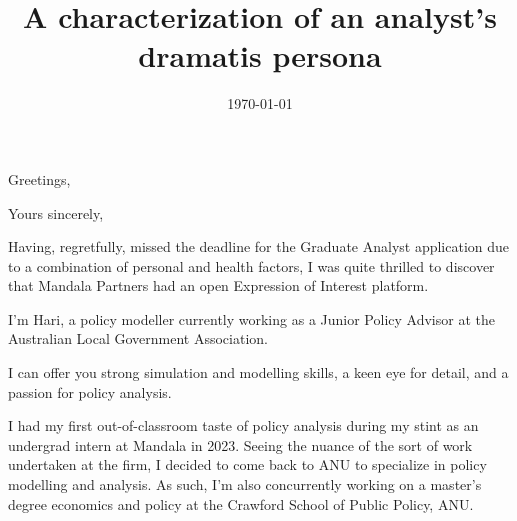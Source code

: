 \documentclass[11pt,a4paper,sans]{moderncv}
\title{A characterization of an analyst's dramatis persona}                               \address{Canberra}{Australia}
\begin{document}
\date{\today}
\opening{Greetings,} %
\closing{Yours sincerely,}

\makelettertitle

Having, regretfully, missed the deadline for the Graduate Analyst application due to a combination of personal and health factors, I was quite thrilled to discover that Mandala Partners had an open Expression of Interest platform.

I'm Hari, a policy modeller currently working as a Junior Policy Advisor at the Australian Local Government Association. 

I can offer you strong simulation and modelling skills, a keen eye for detail, and a passion for policy analysis. 


I had my first out-of-classroom taste of policy analysis during my stint as an undergrad intern at Mandala in 2023. Seeing the nuance of the sort of work undertaken at the firm, I decided to come back to ANU to specialize in policy modelling and analysis. As such, I'm also concurrently working on a master's degree economics and policy at the Crawford School of Public Policy, ANU.

\makeletterclosing
\end{document}
